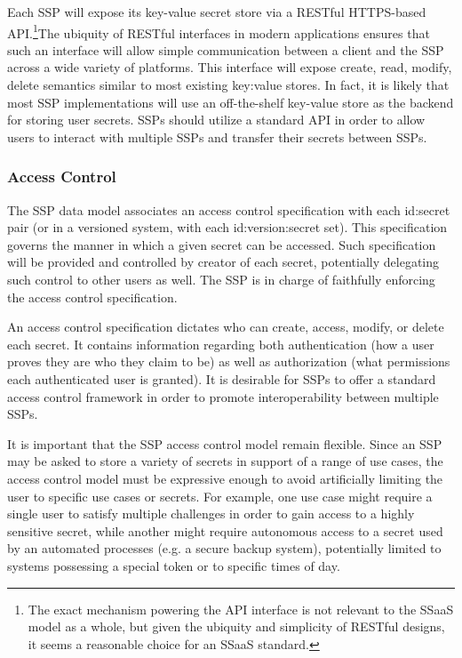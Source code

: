Each SSP will expose its key-value secret store via a RESTful
HTTPS-based API.\footnote{The exact mechanism powering the API
  interface is not relevant to the SSaaS model as a whole, but given
  the ubiquity and simplicity of RESTful designs, it seems a
  reasonable choice for an SSaaS standard.}The ubiquity of RESTful
interfaces in modern applications ensures that such an interface will
allow simple communication between a client and the SSP across a wide
variety of platforms. This interface will expose create, read, modify,
delete semantics similar to most existing key:value stores. In fact,
it is likely that most SSP implementations will use an off-the-shelf
key-value store as the backend for storing user secrets. SSPs should
utilize a standard API in order to allow users to interact with
multiple SSPs and transfer their secrets between SSPs.

\subsubsection{Access Control}

The SSP data model associates an access control specification with
each id:secret pair (or in a versioned system, with each
id:version:secret set). This specification governs the manner in which
a given secret can be accessed. Such specification will be provided
and controlled by creator of each secret, potentially delegating such
control to other users as well. The SSP is in charge of faithfully
enforcing the access control specification.

An access control specification dictates who can create, access,
modify, or delete each secret. It contains information regarding both
authentication (how a user proves they are who they claim to be) as
well as authorization (what permissions each authenticated user is
granted). It is desirable for SSPs to offer a standard access control
framework in order to promote interoperability between multiple SSPs.

It is important that the SSP access control model remain
flexible. Since an SSP may be asked to store a variety of secrets in
support of a range of use cases, the access control model must be
expressive enough to avoid artificially limiting the user to specific
use cases or secrets. For example, one use case might require a single
user to satisfy multiple challenges in order to gain access to a
highly sensitive secret, while another might require autonomous access
to a secret used by an automated processes (e.g. a secure backup
system), potentially limited to systems possessing a special token or
to specific times of day.

